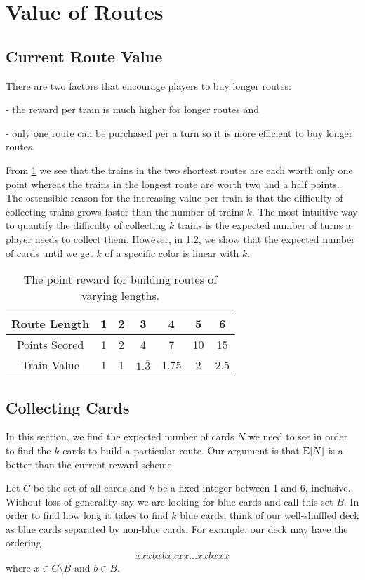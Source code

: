 \section{Value of Routes}
\subsection{Current Route Value}
There are two factors that encourage players to buy longer routes:

- the reward per train is much higher for longer routes and

- only one route can be purchased per a turn so it is more efficient
to buy longer routes.

From \cref{table:current_value} we see that 
the trains in the two shortest routes are each worth only one point
whereas the trains in the longest route are worth two and a half points.
The ostensible reason for the increasing value per train is that the
difficulty of collecting trains grows faster than the number of trains $k$.
The most intuitive way to quantify the difficulty of collecting $k$ trains
is the expected number of turns a player needs to collect them.
However, in \cref{sec:collecting_cards}, 
we show that the expected number of cards
until we get $k$ of a specific color is linear with $k$.

\begin{table}[h!]
\renewcommand{\arraystretch}{1.5}
\centering
\begin{tabular}{| c | c | c | c | c | c | c |}
\hline
 Route Length & 1 & 2 & 3 & 4 & 5 & 6\\
 \hline
 Points Scored & 1 & 2 & 4 & 7 & 10 & 15\\
 \hline
 Train Value & 1 & 1 & $1.\overline{3}$ & 1.75 & 2 & 2.5\\
 \hline
\end{tabular}
\caption{The point reward for building routes
of varying lengths.}
\label{table:current_value}
\end{table}

\subsection{Collecting Cards}\label{sec:collecting_cards}
In this section, we find the expected number of cards
$N$ we need to see in order to find the $k$ cards
to build a particular route.
Our argument is that $\operatorname{\mathrm{E}}[N]$ is a better than the
current reward scheme.

Let $C$ be the set of all cards and $k$ be a fixed integer
between 1 and 6, inclusive.
Without loss of generality say we are looking
for blue cards and call this set $B$.
In order to find how long it takes to find $k$ blue cards,
think of our well-shuffled deck as
blue cards separated by non-blue cards.
For example, our deck may have the ordering
\begin{align}
    xxxbxbxxxx...xxbxxx \nonumber
\end{align}
where $x \in C \setminus B$ and $b \in B$.

